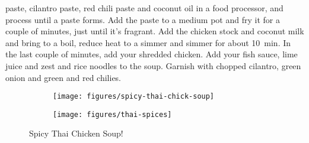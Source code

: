 paste, cilantro paste, red chili paste and coconut oil in a food processor, and
process until a paste forms. Add the paste to a medium pot and fry it for a
couple of minutes, just until it's fragrant. Add the chicken stock and coconut
milk and bring to a boil, reduce heat to a simmer and simmer for about
\SI{10}{\minute}. In the last couple of minutes, add your shredded chicken. Add
your fish sauce, lime juice and zest and rice noodles to the soup. Garnish with
chopped cilantro, green onion and green and red chilies.
\begin{figure}
    \centering
    \begin{subfigure}{0.5\textwidth}
        \centering
        \texttt{[image: figures/spicy-thai-chick-soup]}
    \end{subfigure}
    \begin{subfigure}{0.37\textwidth}
        \centering
        \texttt{[image: figures/thai-spices]}
    \end{subfigure}
    \caption*{Spicy Thai Chicken Soup!}
\end{figure}